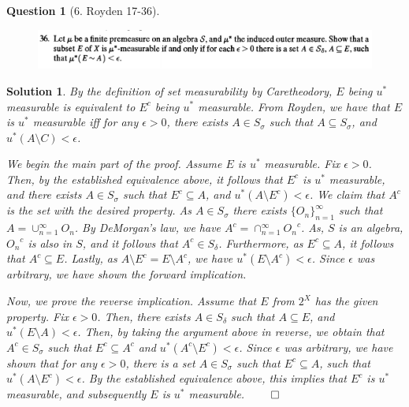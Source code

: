 \documentclass{article} %
\theoremstyle{quest}
\newtheorem*{question}{Question}
\newtheorem*{solution}{Solution}
\begin{document}
\begin{question}[6. Royden 17-36]
\hfill
\begin{figure}[h!]
  \centering
    \includegraphics[width=1\textwidth]{17-36.png}
\end{figure}
\end{question}
\begin{solution}
By the definition of set measurability by Caretheodory, $E$ being
$u^*$ measurable is equivalent to $E^c$ being $u^*$ measurable. From Royden,
we have that $E$ is $u^*$ measurable iff for any $\epsilon > 0$,
there exists $A \in S_{\sigma}$ 
such that $A \subseteq S_{\sigma}$, and $u^{*}(A \setminus C) < \epsilon $.

\smallskip
 
We begin the main part of the proof.
Assume $E$ is $u^*$ measurable. Fix $\epsilon > 0$.
Then, by the established equivalence above,
it follows that $E^c$ is $u^*$ measurable, and there exists $A \in S_{\sigma}$
such that $E^c \subseteq A$, and $u^{*}(A \setminus E^c) < \epsilon $.
We claim that $A^c$ is the set with the desired property. As $A \in S_{\sigma}$
there exists $\{ O_n \}_{n=1}^{\infty}$ such that $A = \cup_{n=1}^{\infty}
O_n$. By DeMorgan's law, we have $A^c = \cap_{n=1}^{\infty} {O_n}^{c}$. As,
$S$ is an algebra, ${O_n}^c$ is also in $S$, and it follows that $A^c \in 
S_{\delta}$. Furthermore, as $E^c \subseteq A$, it follows that $A^c \subseteq
E$. Lastly, as $A \setminus E^c = E \setminus A^c$, we have $u^{*}(
E \setminus A^c) < \epsilon$. Since $\epsilon$ was arbitrary, we have shown
the forward implication. 

Now, we prove the reverse implication. Assume that $E$ from $2^X$ has the
given property.  
Fix $\epsilon > 0$. Then, there exists $A \in S_{\delta}$ such that $A \subseteq
E$, and $u^{*}(E\setminus A) < \epsilon$. Then, by taking the argument
above in reverse, we obtain that $A^c \in S_{\sigma}$ such that 
$E^c \subseteq A^c$ and $u^{*}(A^c \setminus E^c) < \epsilon$. Since $\epsilon$
was arbitrary, we have shown that for any $\epsilon > 0$, there is a set
$A \in S_{\sigma}$ such that $E^c \subseteq A$, such that $u^{*}(A \setminus E^c)
<\epsilon$. By the established equivalence above, this implies that $E^c$ 
is $u^*$ measurable, and subsequently $E$ is $u^*$ measurable.
\hfill $\qed$
 

\end{solution}
\end{document}
